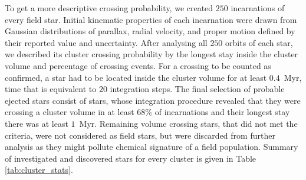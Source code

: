 To get a more descriptive crossing probability, we created $250$ incarnations of every field star. Initial kinematic properties of each incarnation were drawn from Gaussian distributions of parallax, radial velocity, and proper motion defined by their reported value and uncertainty. After analysing all $250$ orbits of each star, we described its cluster crossing probability by the longest stay inside the cluster volume and percentage of crossing events. For a crossing to be counted as confirmed, a star had to be located inside the cluster volume for at least $0.4$~Myr, time that is equivalent to $20$ integration steps. The final selection of probable ejected stars consist of stars, whose integration procedure revealed that they were crossing a cluster volume in at least $68$\% of incarnations and their longest stay there was at least $1$~Myr. Remaining volume crossing stars, that did not met the criteria, were not considered as field stars, but were discarded from further analysis as they might pollute chemical signature of a field population. Summary of investigated and discovered stars for every cluster is given in Table \ref{tab:cluster_stats}.

